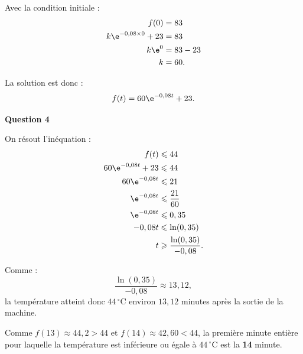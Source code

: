 Avec la condition initiale :
\begin{align*}
f(0) &= 83 \\
k\e^{-0,08\times0} + 23 &= 83 \\
k\e^0 &= 83 - 23 \\
k &= 60.
\end{align*}

La solution est donc :
\[f(t) = 60\e^{-0,08t} + 23.\]

\bigskip

\textbf{Question 4}

\medskip

On résout l'inéquation :
\begin{align*}
f(t) &\leqslant 44 \\
60\e^{-0,08t} + 23 &\leqslant 44 \\
60\e^{-0,08t} &\leqslant 21 \\
\e^{-0,08t} &\leqslant \dfrac{21}{60} \\
\e^{-0,08t} &\leqslant 0,35 \\
-0,08t &\leqslant \ln(0,35) \\
t &\geqslant \dfrac{\ln(0,35)}{-0,08}.
\end{align*}

Comme :
\[\dfrac{\ln(0,35)}{-0,08} \approx 13,12,\]
la température atteint donc $44\,^\circ\mathrm{C}$ environ $13,12$ minutes après la sortie de la machine.

Comme $f(13) \approx 44,2 > 44$ et $f(14) \approx 42,60 < 44$,
la première minute entière pour laquelle la température est inférieure ou égale à $44\,^\circ\mathrm{C}$ est la \textbf{14} minute.

\bigskip
